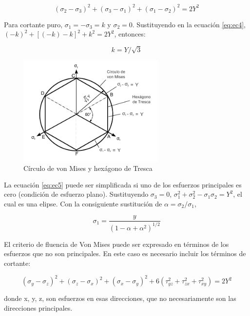 \begin{equation}\label{eq:ec4}
(\sigma_2-\sigma_3)^2 + (\sigma_3-\sigma_1 )^2 + (\sigma_1-\sigma_2 )^2 = 2Y^2
\end{equation}

Para cortante puro, $\sigma_1 = -\sigma_3 = k$ y $\sigma_2=0$. Sustituyendo en la ecuación \ref{eq:ec4}, 
$ (-k)^2 + [ (-k)-k ]^2 + k^2 = 2Y^2 $, entonces:

\begin{equation}\label{eq:ec5}
k = Y / \sqrt{3}
\end{equation}

\begin{figure}[!h]
\centering
\includegraphics[width=0.65\textwidth]{src/ch2/mises_tresca.pdf}
\caption{Círculo de von Mises y hexágono de Tresca}
\label{fig:mises_tresca}
\end{figure}

La ecuación \ref{eq:ec5} puede ser simplificada si uno de los esfuerzos principales es cero (condición de esfuerzo plano). 
Sustituyendo $\sigma_3 = 0$, $\sigma_1^2 + \sigma_2^2 - \sigma_1 \sigma_2 = Y^2$, el cual es una elipse. Con la 
consiguiente sustitución de $\alpha = \sigma_2/\sigma_1$,

\begin{equation}
\sigma_1 = \frac{y}{(1-\alpha+\alpha^2)^{1/2}}
\end{equation}

El criterio de fluencia de Von Mises puede ser expresado en términos de los esfuerzos que no son principales. 
En este caso es necesario incluir los términos de cortante:

\begin{equation}
(\sigma_y - \sigma_z)^2 + (\sigma_z - \sigma_x)^2 + (\sigma_x - \sigma_y)^2 + 6 (\tau_{yz}^2 + \tau_{zx}^2 + \tau_{xy}^2) = 2Y^2
\end{equation}

donde x, y, z, son esfuerzos en esas direcciones, que no necesariamente son las direcciones principales.


